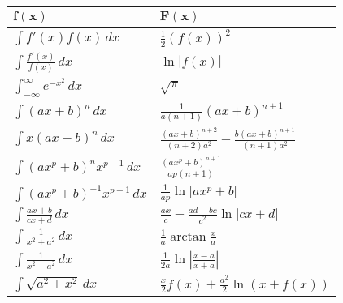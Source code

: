 \begin{center}
  \begin{tabularx}{\linewidth}{>{\centering\arraybackslash}X>{\centering\arraybackslash}X}
    $\mathbf{f(x)}$                        & $\mathbf{F(x)}$                                                  \\
    \midrule
    $\int f'(x) f(x) \, dx$                & $\frac{1}{2}(f(x))^2$                                            \\
    $\int \frac{f'(x)}{f(x)} \, dx$        & $\ln|f(x)|$                                                      \\
    $\int_{-\infty}^\infty e^{-x^2} \, dx$ & $\sqrt{\pi}$                                                     \\
    $\int (ax+b)^n \, dx$                  & $\frac{1}{a(n+1)}(ax+b)^{n+1}$                                   \\
    $\int x(ax+b)^n \, dx$                 & $\frac{(ax+b)^{n+2}}{(n+2)a^2} - \frac{b(ax+b)^{n+1}}{(n+1)a^2}$ \\
    $\int (ax^p+b)^n x^{p-1} \, dx$        & $\frac{(ax^p+b)^{n+1}}{ap(n+1)}$                                 \\
    $\int (ax^p + b)^{-1} x^{p-1} \, dx$   & $\frac{1}{ap} \ln |ax^p + b|$                                    \\
    $\int \frac{ax+b}{cx+d} \, dx$         & $\frac{ax}{c} - \frac{ad-bc}{c^2} \ln |cx +d|$                   \\
    $\int \frac{1}{x^2+a^2} \, dx$         & $\frac{1}{a} \arctan \frac{x}{a}$                                \\
    $\int \frac{1}{x^2 - a^2} \, dx$       & $\frac{1}{2a} \ln\left| \frac{x-a}{x+a} \right|$                 \\
    $\int \sqrt{a^2+x^2} \, dx $           & $\frac{x}{2}f(x) + \frac{a^2}{2}\ln(x+f(x))$                     \\
    \bottomrule
  \end{tabularx}
\end{center}

